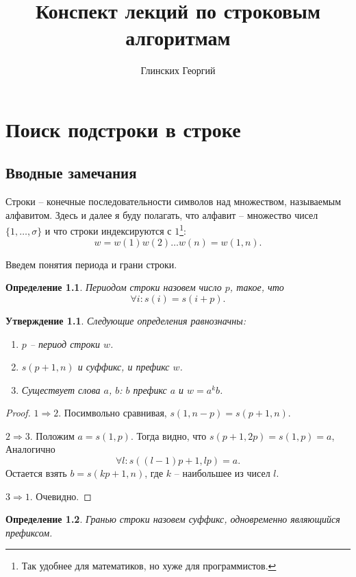\documentclass[10pt]{book}
\author{Глинских Георгий}
\title{Конспект лекций по строковым алгоритмам}
\theoremstyle{plain}
\newtheorem{stm}{Утверждение}[section]
\newtheorem{definition}{Определение}[section]
\begin{document}
\maketitle

\chapter{Поиск подстроки в строке}

\section{Вводные замечания}

Строки -- конечные последовательности символов над множеством, называемым
алфавитом. Здесь и далее я буду полагать, что алфавит -- множество чисел
$\{1, \ldots, \sigma\}$ и что строки индексируются с $1$\footnote{Так
удобнее для математиков, но хуже для программистов.}:
$$w = w(1)w(2)\ldots{}w(n) = w(1,n).$$

Введем понятия периода и грани строки.
\begin{definition}
  \label{period_dfn}
  Периодом строки назовем число $p$, такое, что
  $$\forall i : s(i) = s(i + p).$$ 
\end{definition}

\begin{stm}
  Следующие определения равнозначны:
  \begin{enumerate}
    \item $p$ -- период строки $w$.
    \item $s(p + 1, n)$ и суффикс, и префикс $w$.
    \item Существует слова $a$, $b$: $b$ префикс $a$ и $w = a^k b$.
  \end{enumerate}
\end{stm}
\begin{proof}

$1 \Rightarrow 2$. Посимвольно сравнивая, $s(1, n-p) = s(p + 1, n)$.

$2 \Rightarrow 3$. Положим $a = s(1, p)$. Тогда видно, что
$s(p + 1,2p) = s(1,p) = a$,
Аналогично $$\forall l : s((l-1)p + 1, lp) = a.$$
Остается взять $b = s(kp + 1, n)$, где $k$ -- наибольшее из чисел $l$.

$3 \Rightarrow 1$. Очевидно.

\end{proof}

\begin{definition}
  \label{border_dfn}
  Гранью строки назовем суффикс, одновременно являющийся префиксом. 
\end{definition}
\end{document}
